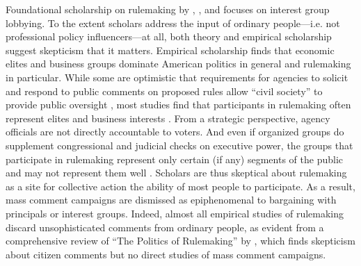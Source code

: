 Foundational scholarship on rulemaking by \citet{Furlong2004}, \citet{Furlong1997, Furlong1998}, and \citet{Kerwin2011} focuses on interest group lobbying. To the extent scholars address the input of ordinary people---i.e. not professional policy influencers---at all, both theory and empirical scholarship suggest skepticism that it matters. 
Empirical scholarship finds that economic elites and business groups dominate American politics in general \citep{Gilens2014} and rulemaking in particular. %
While some are optimistic that requirements for agencies to solicit and respond to public comments on proposed rules allow ``civil society'' to provide public oversight \citep{Michaels2015, Metzger2010}, most studies find that participants in rulemaking often represent elites and business interests \citep{Seifter2016UCLA, Crow2015, Wagner2011, West2009, Yackee2006JOP, Yackee2006JPART, Yackee2012, Golden1998, Haeder2015, Balla2011, Cook2017, Libgober2018meetings}.
From a strategic perspective, agency officials are not directly accountable to voters. And even if organized groups do supplement congressional and judicial checks on executive power, the groups that participate in rulemaking represent only certain (if any) segments of the public and may not represent them well \citep{Seifter2016UCLA}. Scholars are thus skeptical about rulemaking as a site for collective action the ability of most people to participate.
As a result, mass comment campaigns are dismissed as epiphenomenal to bargaining with principals or interest groups. Indeed, almost all empirical studies of rulemaking discard unsophisticated comments from ordinary people, as evident from a comprehensive review of ``The Politics of Rulemaking'' by \citet{Yackee2018}, which finds skepticism about citizen comments but no direct studies of mass comment campaigns.
    
